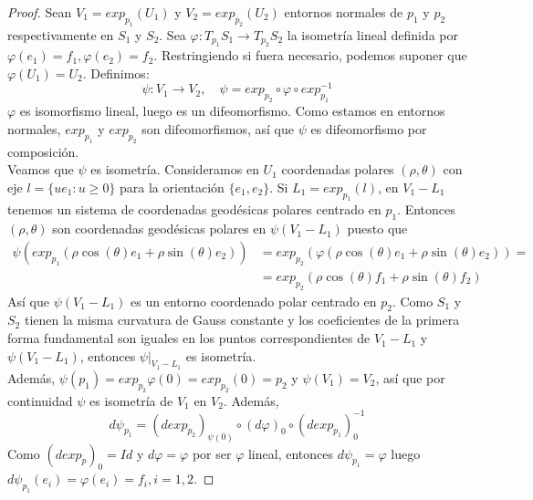 \begin{theorem}
    \begin{proof}
        Sean $V_1 = exp_{p_1}(U_1)$ y $V_2 = exp_{p_2}(U_2)$ entornos normales de $p_1$ y $p_2$ respectivamente en $S_1$ y $S_2$.
        Sea $\varphi: T_{p_1}S_1 \to T_{p_2}S_2$ la isometría lineal definida por $\varphi(e_1) = f_1, \varphi(e_2) = f_2$.
        Restringiendo si fuera necesario, podemos suponer que $\varphi(U_1) = U_2$.
        Definimos: $$\psi: V_1 \to V_2, \quad \psi = exp_{p_2} \circ \varphi \circ exp_{p_1}^{-1}$$
        $\varphi$ es isomorfismo lineal, luego es un difeomorfismo.
        Como estamos en entornos normales, $exp_{p_1}$ y $exp_{p_2}$ son difeomorfismos, así que $\psi$ es difeomorfismo por composición.\\
        Veamos que $\psi$ es isometría.
        Consideramos en $U_1$ coordenadas polares $(\rho, \theta)$ con eje $l = \{ ue_1 : u \geq 0 \}$ para la orientación $\{ e_1, e_2 \}$.
        Si $L_1 = exp_{p_1}(l)$, en $V_1 - L_1$ tenemos un sistema de coordenadas geodésicas polares centrado en $p_1$.
        Entonces $(\rho, \theta)$ son coordenadas geodésicas polares en $\psi(V_1 - L_1)$ puesto que
        \begin{align*}
            \psi(exp_{p_1}(\rho \cos(\theta) e_1 + \rho \sin(\theta) e_2)) & = exp_{p_2} (\varphi(\rho \cos(\theta) e_1 + \rho \sin(\theta) e_2)) = \\
                                                                           & = exp_{p_2}(\rho \cos(\theta) f_1 + \rho \sin(\theta) f_2)
        \end{align*}
        Así que $\psi(V_1 - L_1)$ es un entorno coordenado polar centrado en $p_2$.
        Como $S_1$ y $S_2$ tienen la misma curvatura de Gauss constante y los coeficientes de la primera forma fundamental son iguales en los puntos correspondientes de $V_1 - L_1$ y $\psi(V_1 - L_1)$, entonces $\psi|_{V_1 - L_1}$ es isometría.\\
        Además, $\psi(p_1) = exp_{p_2}\varphi(0) = exp_{p_2}(0) = p_2$ y $\psi(V_1) = V_2$, así que por continuidad $\psi$ es isometría de $V_1$ en $V_2$.
        Además, $$d\psi_{p_1} = (dexp_{p_2})_{\psi(0)} \circ (d\varphi)_0 \circ (dexp_{p_1})_0^{-1}$$
        Como $(dexp_p)_0 = Id$ y $d\varphi = \varphi$ por ser $\varphi$ lineal, entonces $d\psi_{p_1} = \varphi$ luego $d\psi_{p_1}(e_i) = \varphi(e_i) = f_i, i = 1, 2$.
    \end{proof}
\end{theorem}

